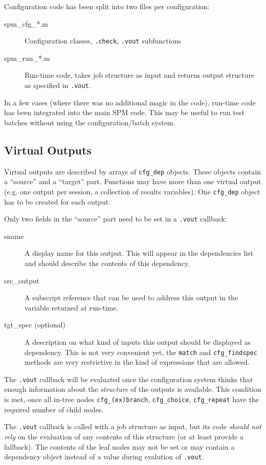 Configuration code has been split into two files per configuration:
\begin{description}
\item[spm\_cfg\_*.m] Configuration classes, \verb|.check|, \verb|.vout|
  subfunctions
\item[spm\_run\_*.m] Run-time code, takes job structure as input and returns
  output structure as specified in \verb|.vout|.
\end{description}
In a few cases (where there was no additional magic in the code), run-time
code has been integrated into the main SPM code. This may be useful to run
test batches without using the configuration/batch system.

\subsection{Virtual Outputs}

Virtual outputs are described by arrays of \verb|cfg_dep| objects. These
objects contain a ``source'' and a ``target'' part. Functions may have more
than one virtual output (e.g. one output per session, a collection of results
variables). One \verb|cfg_dep| object has to be created for each output.

Only two fields in the ``source'' part need to be set in a \verb|.vout|
callback: 
\begin{description}
\item[sname] A display name for this output. This will appear in the
  dependencies list and should describe the contents of this dependency.
\item[src\_output] A subscript reference that can be used to address this
  output in the variable returned at run-time.
\item[tgt\_spec (optional)] A description on what kind of inputs this output
  should be displayed as dependency. This is not very convenient yet, the
  \verb|match| and \verb|cfg_findspec| methods are very restrictive in the
  kind of expressions that are allowed.
\end{description}

The \verb|.vout| callback will be evaluated once the configuration system
thinks that enough information about the \emph{structure} of the outputs is
available. This condition is met, once all in-tree nodes
\verb|cfg_(ex)branch|, \verb|cfg_choice|, \verb|cfg_repeat| have the required
number of child nodes. 

The \verb|.vout| callback is called with a job structure as input, but its
code \emph{should not rely} on the evaluation of any contents of this
structure (or at least provide a fallback). The contents of the leaf nodes may
not be set or may contain a dependency object instead of a value during
evalution of \verb|.vout|.

